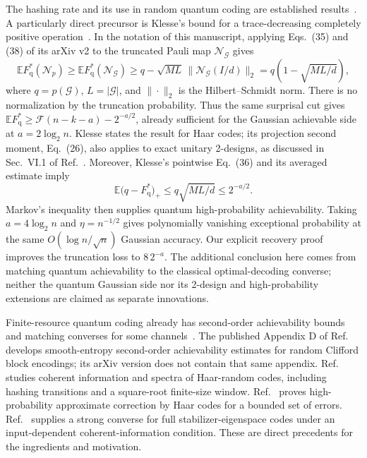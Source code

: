 \documentclass[aps,prl,onecolumn,superscriptaddress,amsmath,amssymb]{revtex4-2}
\newcommand{\E}{\mathbb E}
\newcommand{\N}{\mathcal N}
\newcommand{\Fq}{F_{\mathrm q}^{*}}
\newcommand{\Fs}{\mathcal F}
\begin{document}
The hashing rate and its use in random quantum coding are established results~\cite{Bennett,Devetak}. A particularly direct precursor is Klesse's bound for a trace-decreasing completely positive operation~\cite{Klesse}. In the notation of this manuscript, applying Eqs.~(35) and (38) of its arXiv v2 to the truncated Pauli map $\N_{\mathcal G}$ gives
\begin{equation}
\E\Fq(\N_p)\ge\E\Fq(\N_{\mathcal G})
\ge q-\sqrt{ML}\,\|\N_{\mathcal G}(I/d)\|_2
=q\left(1-\sqrt{ML/d}\right),
\end{equation}
where $q=p(\mathcal G)$, $L=|\mathcal G|$, and $\|\cdot\|_2$ is the Hilbert--Schmidt norm. There is no normalization by the truncation probability. Thus the same surprisal cut gives $\E\Fq\ge\Fs(n-k-a)-2^{-a/2}$, already sufficient for the Gaussian achievable side at $a=2\log_2n$. Klesse states the result for Haar codes; its projection second moment, Eq.~(26), also applies to exact unitary 2-designs, as discussed in Sec.~VI.1 of Ref.~\cite{Sommers}. Moreover, Klesse's pointwise Eq.~(36) and its averaged estimate imply
\begin{equation}
\E\bigl(q-\Fq\bigr)_+\le q\sqrt{ML/d}\le2^{-a/2}.
\end{equation}
Markov's inequality then supplies quantum high-probability achievability. Taking $a=4\log_2n$ and $\eta=n^{-1/2}$ gives polynomially vanishing exceptional probability at the same $O(\log n/\sqrt n)$ Gaussian accuracy. Our explicit recovery proof improves the truncation loss to $8\,2^{-a}$. The additional conclusion here comes from matching quantum achievability to the classical optimal-decoding converse; neither the quantum Gaussian side nor its 2-design and high-probability extensions are claimed as separate innovations.

Finite-resource quantum coding already has second-order achievability bounds and matching converses for some channels~\cite{TBR}. The published Appendix D of Ref.~\cite{Darmawan} develops smooth-entropy second-order achievability estimates for random Clifford block encodings; its arXiv version does not contain that same appendix. Ref.~\cite{Sommers} studies coherent information and spectra of Haar-random codes, including hashing transitions and a square-root finite-size window. Ref.~\cite{MaTanWright} proves high-probability approximate correction by Haar codes for a bounded set of errors. Ref.~\cite{StabilizerConverse} supplies a strong converse for full stabilizer-eigenspace codes under an input-dependent coherent-information condition. These are direct precedents for the ingredients and motivation.
\end{document}

